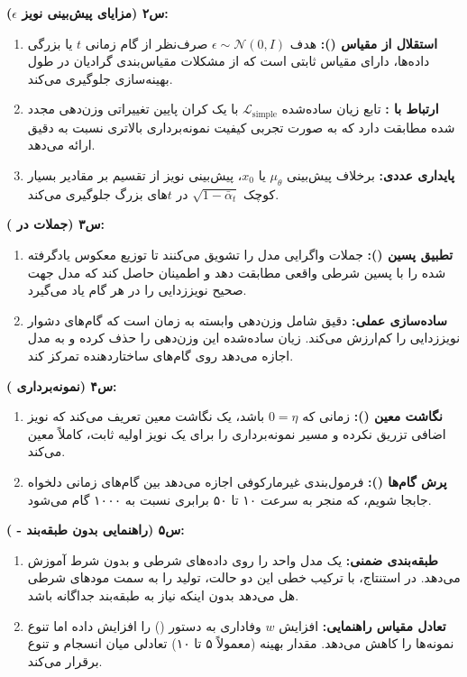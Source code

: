 \begin{latin}
\textbf{س۲ (مزایای پیش‌بینی نویز $\epsilon$):}
\begin{enumerate}
    \item \textbf{استقلال از مقیاس ():} هدف $\epsilon \sim \mathcal{N}(0, I)$ صرف‌نظر از گام زمانی $t$ یا بزرگی داده‌ها، دارای مقیاس ثابتی است که از مشکلات مقیاس‌بندی گرادیان در طول بهینه‌سازی جلوگیری می‌کند.
    \item \textbf{ارتباط با :} تابع زیان ساده‌شده $\mathcal{L}_{\text{simple}}$ با یک کران پایین تغییراتی وزن‌دهی مجدد شده مطابقت دارد که به صورت تجربی کیفیت نمونه‌برداری بالاتری نسبت به  دقیق ارائه می‌دهد.
    \item \textbf{پایداری عددی:} برخلاف پیش‌بینی $\mu_\theta$ یا $x_0$، پیش‌بینی نویز از تقسیم بر مقادیر بسیار کوچک $\sqrt{1 - \bar{\alpha}_t}$ در $t$های بزرگ جلوگیری می‌کند.
\end{enumerate}

\textbf{س۳ (جملات  در ):}
\begin{enumerate}
    \item \textbf{تطبیق پسین ():} جملات واگرایی  مدل را تشویق می‌کنند تا توزیع معکوس یادگرفته شده را با پسین شرطی واقعی مطابقت دهد و اطمینان حاصل کند که مدل جهت صحیح نویززدایی را در هر گام یاد می‌گیرد.
    \item \textbf{ساده‌سازی عملی:}  دقیق شامل وزن‌دهی وابسته به زمان است که گام‌های دشوار نویززدایی را کم‌ارزش می‌کند. زیان ساده‌شده این وزن‌دهی را حذف کرده و به مدل اجازه می‌دهد روی گام‌های ساختاردهنده تمرکز کند.
\end{enumerate}

\textbf{س۴ (نمونه‌برداری ):}
\begin{enumerate}
    \item \textbf{نگاشت معین ():} زمانی که $0 = \eta$ باشد،  یک نگاشت معین تعریف می‌کند که نویز اضافی تزریق نکرده و مسیر نمونه‌برداری را برای یک نویز اولیه ثابت، کاملاً معین می‌کند.
    \item \textbf{پرش گام‌ها ():} فرمول‌بندی غیرمارکوفی اجازه می‌دهد بین گام‌های زمانی دلخواه جابجا شویم، که منجر به سرعت ۱۰ تا ۵۰ برابری نسبت به ۱۰۰۰ گام  می‌شود.
\end{enumerate}



\textbf{س۵ (راهنمایی بدون طبقه‌بند - ):}
\begin{enumerate}
    \item \textbf{طبقه‌بندی ضمنی:}  یک مدل واحد را روی داده‌های شرطی و بدون شرط آموزش می‌دهد. در استنتاج، با ترکیب خطی این دو حالت، تولید را به سمت مودهای شرطی هل می‌دهد بدون اینکه نیاز به طبقه‌بند جداگانه باشد.
    \item \textbf{تعادل مقیاس راهنمایی:} افزایش $w$ وفاداری به دستور () را افزایش داده اما تنوع نمونه‌ها را کاهش می‌دهد. مقدار بهینه (معمولاً ۵ تا ۱۰) تعادلی میان انسجام و تنوع برقرار می‌کند.
\end{enumerate}


\end{latin}
